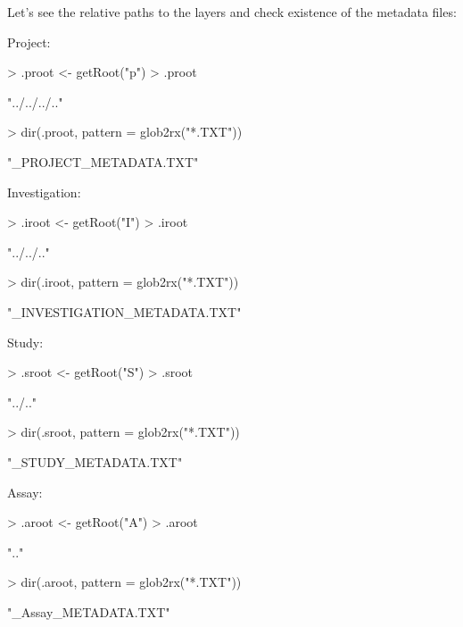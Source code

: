 \documentclass[a4paper,12pt]{article}\usepackage[]{graphicx}\usepackage[]{color}
\begin{document}
Let's see the relative paths to the layers and check existence of the metadata files:

Project:
\begin{Schunk}
\begin{Sinput}
> .proot <- getRoot("p")
> .proot
\end{Sinput}
\begin{Soutput}
[1] "../../../.."
\end{Soutput}
\begin{Sinput}
> dir(.proot, pattern = glob2rx("*.TXT"))
\end{Sinput}
\begin{Soutput}
[1] "_PROJECT_METADATA.TXT"
\end{Soutput}
\end{Schunk}

Investigation:
\begin{Schunk}
\begin{Sinput}
> .iroot <- getRoot("I")
> .iroot
\end{Sinput}
\begin{Soutput}
[1] "../../.."
\end{Soutput}
\begin{Sinput}
> dir(.iroot, pattern = glob2rx("*.TXT"))
\end{Sinput}
\begin{Soutput}
[1] "_INVESTIGATION_METADATA.TXT"
\end{Soutput}
\end{Schunk}

Study:
\begin{Schunk}
\begin{Sinput}
> .sroot <- getRoot("S")
> .sroot
\end{Sinput}
\begin{Soutput}
[1] "../.."
\end{Soutput}
\begin{Sinput}
> dir(.sroot, pattern = glob2rx("*.TXT"))
\end{Sinput}
\begin{Soutput}
[1] "_STUDY_METADATA.TXT"
\end{Soutput}
\end{Schunk}

Assay:
\begin{Schunk}
\begin{Sinput}
> .aroot <- getRoot("A")
> .aroot
\end{Sinput}
\begin{Soutput}
[1] ".."
\end{Soutput}
\begin{Sinput}
> dir(.aroot, pattern = glob2rx("*.TXT"))
\end{Sinput}
\begin{Soutput}
[1] "_Assay_METADATA.TXT"
\end{Soutput}
\end{Schunk}
\end{document}
